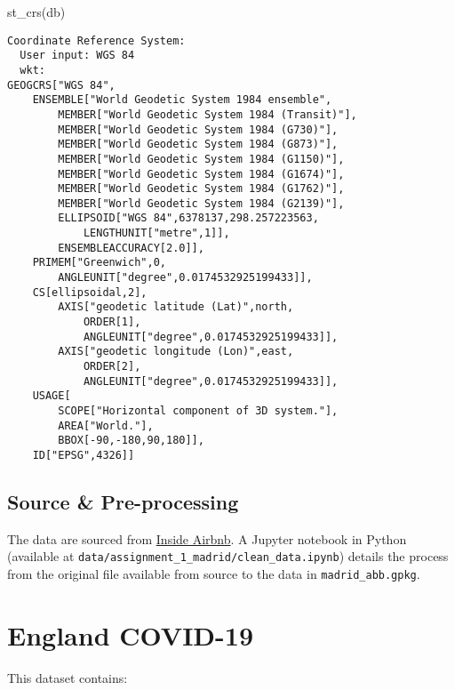 \documentclass[
  letterpaper,
  krantz2]{style/krantz}
\newenvironment{Shaded}{\begin{snugshade}}{\end{snugshade}}
\newcommand{\FunctionTok}[1]{\textcolor[rgb]{0.28,0.35,0.67}{#1}}
\newcommand{\NormalTok}[1]{\textcolor[rgb]{0.00,0.23,0.31}{#1}}
\begin{document}
\begin{Shaded}
\begin{Highlighting}[]
\FunctionTok{st\_crs}\NormalTok{(db)}
\end{Highlighting}
\end{Shaded}

\begin{verbatim}
Coordinate Reference System:
  User input: WGS 84 
  wkt:
GEOGCRS["WGS 84",
    ENSEMBLE["World Geodetic System 1984 ensemble",
        MEMBER["World Geodetic System 1984 (Transit)"],
        MEMBER["World Geodetic System 1984 (G730)"],
        MEMBER["World Geodetic System 1984 (G873)"],
        MEMBER["World Geodetic System 1984 (G1150)"],
        MEMBER["World Geodetic System 1984 (G1674)"],
        MEMBER["World Geodetic System 1984 (G1762)"],
        MEMBER["World Geodetic System 1984 (G2139)"],
        ELLIPSOID["WGS 84",6378137,298.257223563,
            LENGTHUNIT["metre",1]],
        ENSEMBLEACCURACY[2.0]],
    PRIMEM["Greenwich",0,
        ANGLEUNIT["degree",0.0174532925199433]],
    CS[ellipsoidal,2],
        AXIS["geodetic latitude (Lat)",north,
            ORDER[1],
            ANGLEUNIT["degree",0.0174532925199433]],
        AXIS["geodetic longitude (Lon)",east,
            ORDER[2],
            ANGLEUNIT["degree",0.0174532925199433]],
    USAGE[
        SCOPE["Horizontal component of 3D system."],
        AREA["World."],
        BBOX[-90,-180,90,180]],
    ID["EPSG",4326]]
\end{verbatim}

\hypertarget{source-pre-processing}{%
\subsection*{Source \& Pre-processing}\label{source-pre-processing}}

The data are sourced from \href{http://insideairbnb.com/}{Inside
Airbnb}. A Jupyter notebook in Python (available at
\texttt{data/assignment\_1\_madrid/clean\_data.ipynb}) details the
process from the original file available from source to the data in
\texttt{madrid\_abb.gpkg}.

\hypertarget{england-covid-19}{%
\section{England COVID-19}\label{england-covid-19}}

This dataset contains:
\end{document}
